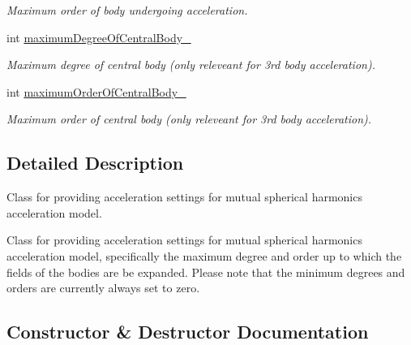 \begin{DoxyCompactItemize}
\begin{DoxyCompactList}\small\item\em Maximum order of body undergoing acceleration. \end{DoxyCompactList}\item 
int \hyperlink{classtudat_1_1simulation__setup_1_1MutualSphericalHarmonicAccelerationSettings_a43a495a3a4a61022121492ddb084b970}{maximum\+Degree\+Of\+Central\+Body\+\_\+}\hypertarget{classtudat_1_1simulation__setup_1_1MutualSphericalHarmonicAccelerationSettings_a43a495a3a4a61022121492ddb084b970}{}\label{classtudat_1_1simulation__setup_1_1MutualSphericalHarmonicAccelerationSettings_a43a495a3a4a61022121492ddb084b970}

\begin{DoxyCompactList}\small\item\em Maximum degree of central body (only releveant for 3rd body acceleration). \end{DoxyCompactList}\item 
int \hyperlink{classtudat_1_1simulation__setup_1_1MutualSphericalHarmonicAccelerationSettings_a86bd96a07d1981e7fb023471e99b140d}{maximum\+Order\+Of\+Central\+Body\+\_\+}\hypertarget{classtudat_1_1simulation__setup_1_1MutualSphericalHarmonicAccelerationSettings_a86bd96a07d1981e7fb023471e99b140d}{}\label{classtudat_1_1simulation__setup_1_1MutualSphericalHarmonicAccelerationSettings_a86bd96a07d1981e7fb023471e99b140d}

\begin{DoxyCompactList}\small\item\em Maximum order of central body (only releveant for 3rd body acceleration). \end{DoxyCompactList}\end{DoxyCompactItemize}


\subsection{Detailed Description}
Class for providing acceleration settings for mutual spherical harmonics acceleration model. 

Class for providing acceleration settings for mutual spherical harmonics acceleration model, specifically the maximum degree and order up to which the fields of the bodies are be expanded. Please note that the minimum degrees and orders are currently always set to zero. 

\subsection{Constructor \& Destructor Documentation}

